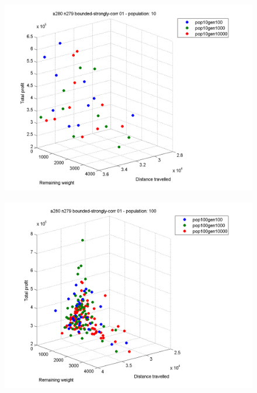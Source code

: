 \documentclass[a4paper,12pt]{article}
\begin{document}
\begin{figure}[h]
\centering
\begin{minipage}{.5\textwidth}
  \centering
  \includegraphics[width=.8\linewidth]{q4graphs/a280_n279_pop10.png}
  \label{fig:a28027910}
\end{minipage}%
\begin{minipage}{.5\textwidth}
  \centering
  \includegraphics[width=.8\linewidth]{q4graphs/a280_n279_pop100.png}
  \label{fig:a280279100}
\end{minipage}
\end{figure}
\end{document}
